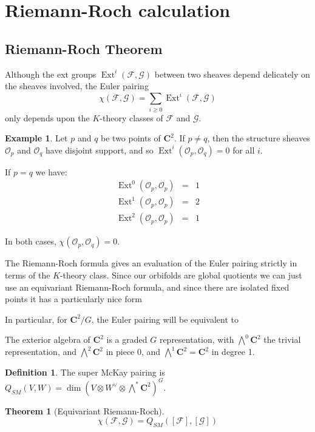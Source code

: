 \documentclass{amsart}[12pt]
\theoremstyle{definition}
\newtheorem{theorem}[dummy]{Theorem}
\newtheorem{example}[dummy]{Example}
\newtheorem{definition}[dummy]{Definition}
\newcommand{\C}{\mathbf{C}}
\DeclareMathOperator{\Ext}{Ext}
\begin{document}
\section{Riemann-Roch calculation}

\subsection{Riemann-Roch Theorem}
Although the ext groups $\Ext^i(\mathcal{F},\mathcal{G})$ between two sheaves depend delicately on the sheaves involved, the Euler pairing
$$\chi(\mathcal{F},\mathcal{G})=\sum_{i\geq 0} \Ext^i(\mathcal{F},\mathcal{G})$$
only depends upon the $K$-theory classes of $\mathcal{F}$ and $\mathcal{G}$.  

\begin{example}
Let $p$ and $q$ be two points of $\C^2$.  If $p\neq q$, then the structure sheaves $\mathcal{O}_p$ and $\mathcal{O}_q$ have disjoint support, and so $\Ext^i(\mathcal{O}_p,\mathcal{O}_q)=0$ for all $i$.

If $p=q$ we have:
\begin{eqnarray*}
\Ext^0(\mathcal{O}_p,\mathcal{O}_p)&=&1\\
\Ext^1(\mathcal{O}_p,\mathcal{O}_p)&=&2\\
\Ext^2(\mathcal{O}_p,\mathcal{O}_p)&=&1 
\end{eqnarray*}

In both cases, $\chi(\mathcal{O}_p,\mathcal{O}_q)=0$.
\end{example}

The Riemann-Roch formula gives an evaluation of the Euler pairing strictly in terms of the $K$-theory class.  Since our orbifolds are global quotients we can just use an equivariant Riemann-Roch formula, and since there are isolated fixed points it has a particularly nice form

In particular, for $\C^2/G$, the Euler pairing will be equivalent to 

The exterior algebra of $\C^2$ is a graded $G$ representation, with $\bigwedge^0\C^2$ the trivial representation, and $\bigwedge^2\C^2$ in piece 0, and $\bigwedge^1\C^2=\C^2$ in degree 1.  

\begin{definition}
The super McKay pairing is $Q_{SM}(V,W)=\dim (V\otimes W^\vee\otimes\bigwedge^*\C^2)^G$.
\end{definition}


\begin{theorem}[Equivariant Riemann-Roch]
$$\chi(\mathcal{F},\mathcal{G})=Q_{SM}([\mathcal{F}],[\mathcal{G}])$$
\end{theorem}
\end{document}
